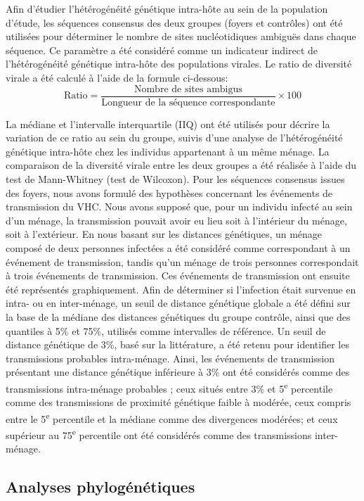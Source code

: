 \documentclass[a4paper,12pt]{article}
\begin{document}
Afin d’étudier l’hétérogénéité génétique intra-hôte au sein de la population d’étude, les séquences consensus des deux groupes (foyers et contrôles) ont été utilisées pour déterminer le nombre de sites nucléotidiques ambiguës dans chaque séquence. Ce paramètre a été considéré comme un indicateur indirect de l’hétérogénéité génétique intra-hôte des populations virales. Le ratio de diversité virale a été calculé à l’aide de la formule ci-dessous:
\[
\text{Ratio} =
\frac{\text{Nombre de sites ambigus}}
{\text{Longueur de la séquence correspondante}}
\times 100
\]

La médiane et l’intervalle interquartile (IIQ) ont été utilisés pour décrire la variation de ce ratio au sein du groupe, suivis d’une analyse de l’hétérogénéité génétique intra-hôte chez les individus appartenant à un même ménage. La comparaison de la diversité virale entre les deux groupes a été réalisée à l’aide du test de Mann-Whitney (test de Wilcoxon).
Pour les séquences consensus issues des foyers, nous avons formulé des hypothèses concernant les événements de transmission du VHC. Nous avons supposé que, pour un individu infecté au sein d’un ménage, la transmission pouvait avoir eu lieu soit à l’intérieur du ménage, soit à l’extérieur. En nous basant sur les distances génétiques, un ménage composé de deux personnes infectées a été considéré comme correspondant à un événement de transmission, tandis qu’un ménage de trois personnes correspondait à trois événements de transmission. Ces événements de transmission ont ensuite été représentés graphiquement.
Afin de déterminer si l’infection était survenue en intra- ou en inter-ménage, un seuil de distance génétique globale a été défini sur la base de la médiane des distances génétiques du groupe contrôle, ainsi que des quantiles à 5\% et 75\%, utilisés comme intervalles de référence. Un seuil de distance génétique de 3\%, basé sur la littérature, a été retenu pour identifier les transmissions probables intra-ménage. Ainsi, les événements de transmission présentant une distance génétique inférieure à 3\% ont été considérés comme des transmissions intra-ménage probables ; ceux situés entre 3\% et 5\textsuperscript{e} percentile comme des transmissions de proximité génétique faible à modérée, ceux compris entre le 5\textsuperscript{e} percentile et la médiane comme des divergences modérées; et ceux supérieur au 75\textsuperscript{e} percentile ont été considérés comme des transmissions inter-ménage.
  

\subsection{Analyses phylogénétiques}
\end{document}
